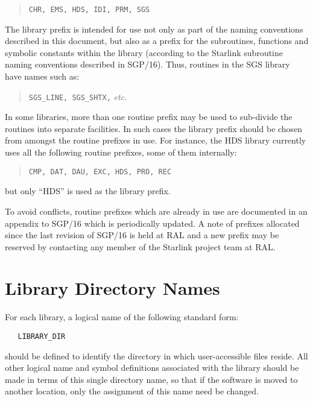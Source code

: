 \begin{quote}
\begin{center}
{\tt CHR, EMS, HDS, IDI, PRM, SGS}
\end{center}
\end{quote}

The library prefix is intended for use not only as part of the naming
conventions described in this document, but also as a prefix for the
subroutines, functions and symbolic constants within the library (according
to the Starlink subroutine naming conventions described in SGP/16).
Thus, routines in the SGS library have names such as:

\begin{quote}
\begin{center}
{\tt SGS\_LINE, SGS\_SHTX,} {\em etc.}
\end{center}
\end{quote}

In some libraries, more than one routine prefix may be used to sub-divide
the routines into separate facilities.
In such cases the library prefix should be chosen from amongst the
routine prefixes in use.
For instance, the HDS library currently uses all the following routine prefixes,
some of them internally:

\begin{quote}
\begin{center}
{\tt CMP, DAT, DAU, EXC, HDS, PRO, REC}
\end{center}
\end{quote}

but only ``HDS'' is used as the library prefix.

To avoid conflicts, routine prefixes which are already in use are documented
in an appendix to SGP/16 which is periodically updated.
A note of prefixes allocated since the last revision of SGP/16 is held at
RAL and a new prefix may be reserved by contacting any member of the
Starlink project team at RAL.

\section{Library Directory Names}

For each library, a logical name of the following standard form:

\begin{verbatim}
   LIBRARY_DIR
\end{verbatim}

should be defined to identify the directory in which user-accessible files
reside.
All other logical name and symbol definitions associated with the library
should be made in terms of this single directory name, so that if the
software is moved to another location, only the assignment of this name need
be changed.

